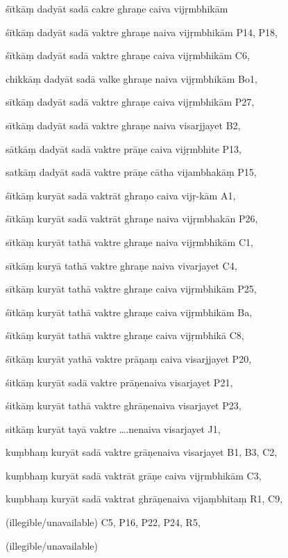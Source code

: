\begin{ekdosis}
\begin{marma}[hp01_055]
\begin{marma}[hp02_009]
\begin{marma}[hp02_011]
\begin{marma}[hp02_55ab]
\item[śītkāṃ dadyāt sadā cakre ghraṇe caiva vijṛmbhikām]
\item[śītkāṃ dadyāt sadā vaktre ghraṇe naiva vijṛmbhikām] P14, P18, 
\item[śītkāṃ dadyāt sadā vaktre ghraṇe caiva vijṛmbhikām] C6, 
\item[chikkāṃ dadyāt sadā valke ghraṇe naiva vijṛmbhikām] Bo1, 
\item[sītkāṃ dadyāt sadā vaktre ghraṇe caiva vijṛmbhikām] P27,
\item[sītkāṃ dadyāt sadā vaktre ghraṇe naiva visarjjayet] B2,
\item[sātkāṃ dadyāt sadā vaktre prāṇe caiva vijṛmbhite] P13,
\item[satkāṃ dadyāt sadā vaktre prāṇe cātha vijambhakāṃ] P15,
\item[śītkāṃ kuryāt sadā vaktrāt ghraṇo caiva vijṛ-kām] A1,
\item[śītkāṃ kuryāt sadā vaktrāt ghraṇe naiva vijṛmbhakān] P26,
\item[sītkāṃ kuryāt tathā vaktre ghraṇe naiva vijṛmbhikām] C1,
\item[sītkāṃ kuryā tathā vaktre ghraṇe naiva vivarjayet] C4,
\item[sītkāṃ kuryāt tathā vaktre ghraṇe caiva vijṛmbhikām] P25,  
\item[śītkāṃ kuryāt tathā vaktre ghraṇe caiva vijṛmbhikām] Ba,  
\item[śītkāṃ kuryāt tathā vaktre ghraṇe caiva vijṛmbhikā] C8,  
\item[śītkāṃ kuryāt yathā vaktre prāṇaṃ caiva visarjjayet] P20, 
\item[śitkāṃ kuryāt sadā vaktre prāṇenaiva visarjayet] P21,
\item[śitkāṃ kuryāt tathā vaktre ghrāṇenaiva visarjayet] P23, 
\item[sitkāṃ kuryāt tayā vaktre ….nenaiva visarjayet] J1,
\item[kuṃbhaṃ kuryāt sadā vaktre grāṇenaiva visarjayet] B1, B3, C2,  
\item[kuṃbhaṃ kuryāt sadā vaktrāt grāṇe caiva vijṛmbhikām] C3,
\item[kuṃbhaṃ kuryāt sadā vaktrat ghrāṇenaiva vijaṃbhitaṃ] R1, C9,  
\item[(illegible/unavailable)] C5, P16, P22, P24, R5,

\item[]
\item[(illegible/unavailable)] 


\end{marma}
\end{marma}
\end{marma}
\end{marma}
\end{ekdosis}
